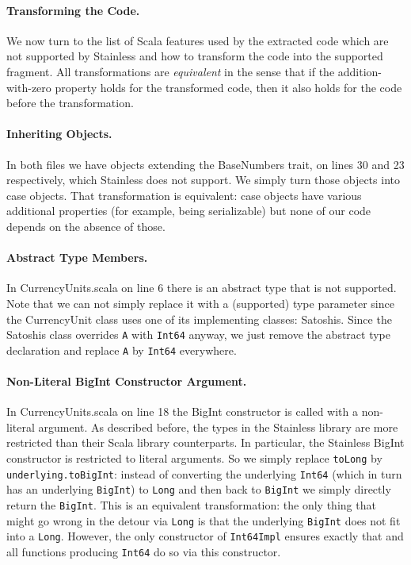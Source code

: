 \documentclass[hyphens, a4paper,USenglish,cleveref, autoref, thm-restate]{oasics-v2019}
\begin{document}
\paragraph{Transforming the Code.} We now turn to the list of Scala
features used by the extracted code which are not supported by
Stainless and how to transform the code into the supported fragment.
All transformations are \emph{equivalent} in the sense that if the
addition-with-zero property holds for the transformed code, then it
also holds for the code before the transformation.

\paragraph{Inheriting Objects.} In both files we have objects
extending the BaseNumbers trait, on lines 30 and 23 respectively,
which Stainless does not support. We simply turn those objects into
case objects. That transformation is equivalent: case objects have
various additional properties (for example, being serializable) but
none of our code depends on the absence of those.

\paragraph{Abstract Type Members.} In CurrencyUnits.scala on line 6
there is an abstract type that is not supported. Note that we can not
simply replace it with a (supported) type parameter since the
CurrencyUnit class uses one of its implementing classes:
Satoshis. Since the Satoshis class overrides \texttt{A} with \texttt{Int64} anyway, we
just remove the abstract type declaration and replace \texttt{A} by \texttt{Int64}
everywhere.

\paragraph{Non-Literal BigInt Constructor Argument.} In
CurrencyUnits.scala on line 18 the BigInt constructor is called with a
non-literal argument. As described before, the types in the Stainless
library are more restricted than their Scala library counterparts. In
particular, the Stainless BigInt constructor is restricted to literal
arguments. So we simply replace \texttt{toLong} by
\texttt{underlying.toBigInt}: instead of converting the underlying
\texttt{Int64} (which in turn has an underlying \texttt{BigInt}) to
\texttt{Long} and then back to \texttt{BigInt} we simply directly
return the \texttt{BigInt}. This is an equivalent transformation: the
only thing that might go wrong in the detour via \texttt{Long} is that
the underlying \texttt{BigInt} does not fit into a
\texttt{Long}. However, the only constructor of \texttt{Int64Impl}
ensures exactly that and all functions producing \texttt{Int64} do so
via this constructor.
\end{document}
